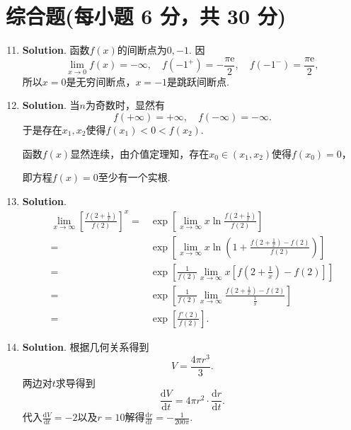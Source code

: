 \documentclass[../main.tex]{subfiles}
\begin{document}
\section{综合题(每小题 6 分，共 30 分)}
\begin{enumerate}
    \setcounter{enumi}{10}
    \item \textbf{Solution}. 函数$f(x)$的间断点为$0,-1$. 因
          \[
              \lim_{x\to0}f(x)=-\infty,\quad f(-1^{+})=-\frac{\pi\mathrm{e}}{2},\quad f
                  (-1^{-})=\frac{\pi\mathrm{e}}{2},
          \]
          所以$x=0$是无穷间断点，$x=-1$是跳跃间断点.

    \item \textbf{Solution}. 当$n$为奇数时，显然有
          \[
              f\left(+\infty\right)=+\infty,\quad f\left(-\infty\right)=-\infty.
          \]
          于是存在$x_{1},x_{2}$使得$f(x_{1})<0<f(x_{2})$.

          函数$f(x)$显然连续，由介值定理知，存在$x_{0}\in(x_{1},x_{2})$使得$f(x_{0})=0$，

          即方程$f(x)=0$至少有一个实根.

    \item \textbf{Solution}.
          \[
              \begin{aligned}
                  \lim_{x\to\infty}\left[\frac{f\left(2+\frac{1}{x}\right)}{f(2)}\right]^{x} = {} & \exp\left[{\lim\limits_{x\to\infty}x\ln\frac{f\left(2+\frac{1}{x}\right)}{f(2)}}\right]                       \\
                  = {}                                                                            & \exp\left[{\lim\limits_{x\to\infty}x\ln\left(1+\frac{f\left(2+\frac{1}{x}\right)-f(2)}{f(2)}\right)}\right]   \\
                  = {}                                                                            & \exp\left[{\frac{1}{f(2)}\lim\limits_{x\to\infty}x\left[f\left(2+\frac{1}{x}\right)-f(2)\right]}\right]       \\
                  = {}                                                                            & \exp\left[{\frac{1}{f(2)}\lim\limits_{x\to\infty}\frac{f\left(2+\frac{1}{x}\right)-f(2)}{\frac{1}{x}}}\right] \\
                  = {}                                                                            & \exp\left[{\frac{f'(2)}{f(2)}}\right].
              \end{aligned}
          \]

    \item \textbf{Solution}. 根据几何关系得到
          \[
              V=\frac{4\pi r^{3}}{3}.
          \]
          两边对$t$求导得到
          \[
              \frac{\mathrm{d}V}{\mathrm{d}t}=4\pi r^{2}\cdot\frac{\mathrm{d}r}{\mathrm{d}t}
              .
          \]
          代入$\frac{\mathrm{d}V}{\mathrm{d}t}=-2$以及$r=10$解得$\frac{\mathrm{d}r}{\mathrm{d}t}
              =-\frac{1}{200\pi}$.


\end{enumerate}
\end{document}
